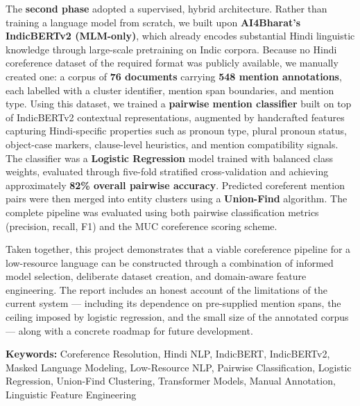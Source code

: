 \documentclass[12pt,a4paper]{report}
\begin{document}
\noindent The \textbf{second phase} adopted a supervised, hybrid architecture. Rather than training a language model from scratch, we built upon \textbf{AI4Bharat's IndicBERTv2 (MLM-only)}, which already encodes substantial Hindi linguistic knowledge through large-scale pretraining on Indic corpora. Because no Hindi coreference dataset of the required format was publicly available, we manually created one: a corpus of \textbf{76 documents} carrying \textbf{548 mention annotations}, each labelled with a cluster identifier, mention span boundaries, and mention type. Using this dataset, we trained a \textbf{pairwise mention classifier} built on top of IndicBERTv2 contextual representations, augmented by handcrafted features capturing Hindi-specific properties such as pronoun type, plural pronoun status, object-case markers, clause-level heuristics, and mention compatibility signals. The classifier was a \textbf{Logistic Regression} model trained with balanced class weights, evaluated through five-fold stratified cross-validation and achieving approximately \textbf{82\% overall pairwise accuracy}. Predicted coreferent mention pairs were then merged into entity clusters using a \textbf{Union-Find} algorithm. The complete pipeline was evaluated using both pairwise classification metrics (precision, recall, F1) and the MUC coreference scoring scheme.

\noindent Taken together, this project demonstrates that a viable coreference pipeline for a low-resource language can be constructed through a combination of informed model selection, deliberate dataset creation, and domain-aware feature engineering. The report includes an honest account of the limitations of the current system --- including its dependence on pre-supplied mention spans, the ceiling imposed by logistic regression, and the small size of the annotated corpus --- along with a concrete roadmap for future development.

\vspace{0.5cm}
\noindent \textbf{Keywords:} Coreference Resolution, Hindi NLP, IndicBERT, IndicBERTv2, Masked Language Modeling, Low-Resource NLP, Pairwise Classification, Logistic Regression, Union-Find Clustering, Transformer Models, Manual Annotation, Linguistic Feature Engineering

\newpage
\tableofcontents

\newpage
\listoffigures
{}
\end{document}
